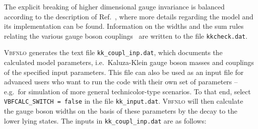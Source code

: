\documentclass[english,12pt]{article}
\begin{document}
The explicit breaking of higher dimensional gauge invariance is balanced
according to the description of Ref.~\cite{KK}, where more details regarding the model and
its implementation can be found.  Information on the widths and the sum
rules relating the various gauge boson couplings~\cite{Csaki:2003dt} are written
to the file {\tt kkcheck.dat}.

\textsc{Vbfnlo} generates the text file {\tt kk\_coupl\_inp.dat}, which
documents the calculated model parameters, i.e.\ Kaluza-Klein gauge boson
masses and couplings of the specified input parameters. This file can
also be used as an input file for advanced users who want to run the code with
their own set of parameters -- e.g.\ for simulation of more general
technicolor-type scenarios. To that end, select {\tt VBFCALC\_SWITCH = false}
in the file {\tt kk\_input.dat}. \textsc{Vbfnlo} will then calculate the gauge
boson widths on the  basis of these parameters by the decay to the lower lying
states.  The inputs in {\tt kk\_coupl\_inp.dat} are as follows:
\end{document}
